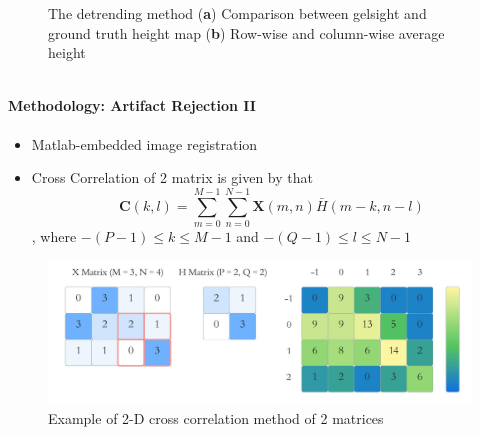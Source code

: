 \documentclass[
11pt,notheorems,hyperref={pdfauthor=whatever}
]{beamer}
\begin{document}
\begin{frame}
\begin{columns}[T,onlytextwidth]
\begin{figure}[h]
                \captionsetup{justification=centering}
                \caption{The detrending method (\textbf{a}) Comparison between gelsight and ground truth height map (\textbf{b}) Row-wise and column-wise average height}
            \end{figure}
    \end{columns}
\end{frame}

\begin{frame}
    \framesubtitle{Methodology: Artifact Rejection II}
    \vspace{-15px}
    \begin{itemize}
        \item Matlab-embedded image registration
        \item Cross Correlation of 2 matrix is given by that
         $$\textbf{C}(k,l) = \sum^{M-1}_{m=0}\sum^{N-1}_{n=0}\textbf{X}(m,n)\bar{H}(m-k,n-l)$$, where 
         $-(P-1)\leq k \leq M-1$ and $-(Q-1)\leq l \leq N-1$
    \end{itemize}
    \begin{figure}[h]
        \renewcommand{\figurename}{Figure 13}
        \includegraphics [scale=0.17] {Neuro_CrossCor.jpg} 
        \captionsetup{justification=centering}
        \caption{Example of 2-D cross correlation method of 2 matrices}
    \end{figure}
\end{frame}
\end{document}
